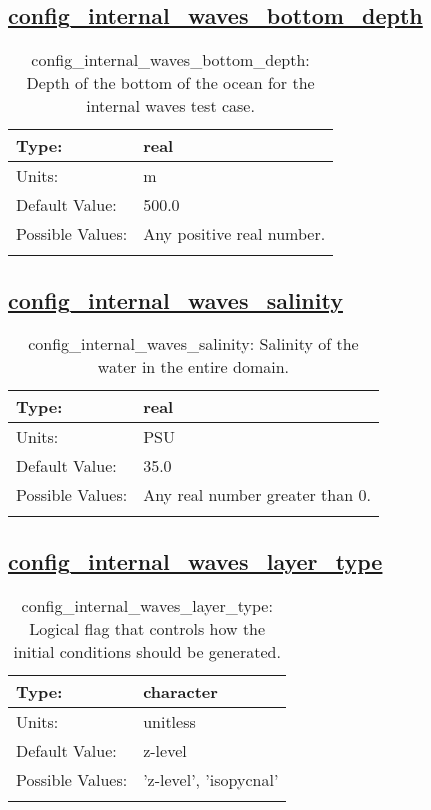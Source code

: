\subsection[config\_internal\_waves\_bottom\_depth]{\hyperref[sec:nm_tab_internal_waves]{config\_internal\_waves\_bottom\_depth}}
\label{subsec:nm_sec_config_internal_waves_bottom_depth}
\begin{center}
\begin{longtable}{| p{2.0in} || p{4.0in} |}
    \hline
    Type: & real \\
    \hline
    Units: & \si{m} \\
    \hline
    Default Value: & 500.0 \\
    \hline
    Possible Values: & Any positive real number. \\
    \hline
    \caption{config\_internal\_waves\_bottom\_depth: Depth of the bottom of the ocean for the internal waves test case.}
\end{longtable}
\end{center}
\subsection[config\_internal\_waves\_salinity]{\hyperref[sec:nm_tab_internal_waves]{config\_internal\_waves\_salinity}}
\label{subsec:nm_sec_config_internal_waves_salinity}
\begin{center}
\begin{longtable}{| p{2.0in} || p{4.0in} |}
    \hline
    Type: & real \\
    \hline
    Units: & \si{PSU} \\
    \hline
    Default Value: & 35.0 \\
    \hline
    Possible Values: & Any real number greater than 0. \\
    \hline
    \caption{config\_internal\_waves\_salinity: Salinity of the water in the entire domain.}
\end{longtable}
\end{center}
\subsection[config\_internal\_waves\_layer\_type]{\hyperref[sec:nm_tab_internal_waves]{config\_internal\_waves\_layer\_type}}
\label{subsec:nm_sec_config_internal_waves_layer_type}
\begin{center}
\begin{longtable}{| p{2.0in} || p{4.0in} |}
    \hline
    Type: & character \\
    \hline
    Units: & \si{unitless} \\
    \hline
    Default Value: & z-level \\
    \hline
    Possible Values: & 'z-level', 'isopycnal' \\
    \hline
    \caption{config\_internal\_waves\_layer\_type: Logical flag that controls how the initial conditions should be generated.}
\end{longtable}
\end{center}
